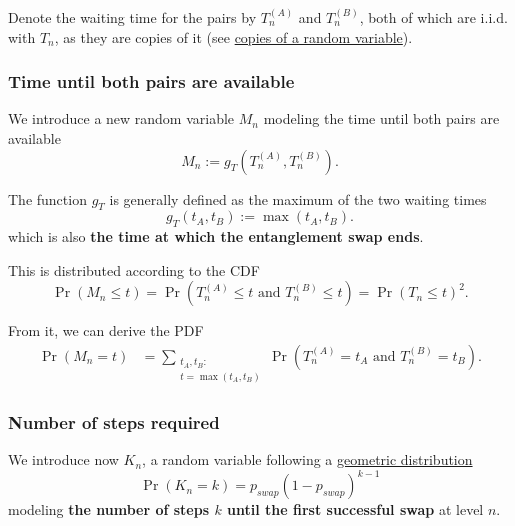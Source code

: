 \documentclass{masterthesis}
\begin{document}
Denote the waiting time for the pairs by $T_n^{(A)}$ and $T_n^{(B)}$, both of which are i.i.d. with $T_n$, as they are copies of it (see \hyperref[paragraph:copies_of_a_random_variable]{copies of a random variable}).

\subsubsection*{Time until both pairs are available}

We introduce a new random variable $M_n$ modeling the time until both pairs are available
\begin{equation}\label{eq:waiting_time_pair}
    M_n := g_T(T_n^{(A)} , T_n^{(B)}) .
\end{equation}

The function $g_T$ is generally defined as the maximum of the two waiting times
\begin{equation}\label{eq:waiting_time_pair_max}
    g_T(t_A, t_B) := \max(t_A, t_B).
\end{equation}
which is also \textbf{the time at which the entanglement swap ends}. 

This is distributed according to the CDF
\begin{equation}
    \Pr(M_n \leq t) = \Pr(T_n^{(A)} \leq t \text{ and } T_n^{(B)} \leq t) = \Pr(T_n \leq t) ^ 2.
\end{equation}

From it, we can derive the PDF
\begin{align}\label{eq:pdf_waiting_time_pair}
    \Pr(M_n = t) &= \sum_{\substack{t_A, t_B: \\ t = \max(t_A, t_B)}} \Pr(T_n^{(A)} = t_A \text{ and } T_n^{(B)} = t_B) .
\end{align}


\subsubsection*{Number of steps required}

We introduce now $K_n$, a random variable following a \hyperref[subsection:geometric_pdf]{geometric distribution}
\begin{equation}\label{eq:pdf_swap_steps}
    \Pr(K_n = k) = p_{swap} (1 - p_{swap})^{k-1}
\end{equation}
modeling \textbf{the number of steps $k$ until the first successful swap} at level $n$.
\end{document}
